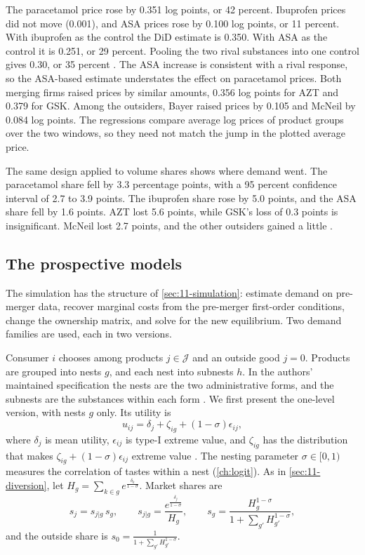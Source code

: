 The paracetamol price rose by 0.351 log points, or 42 percent. Ibuprofen prices did not move (0.001), and ASA prices
rose by 0.100 log points, or 11 percent. With ibuprofen as the control the DiD estimate is 0.350. With ASA as the
control it is 0.251, or 29 percent. Pooling the two rival substances into one control gives 0.30, or 35 percent
\citep[fn.~17]{BjornerstedtVerboven2013}. The ASA increase is consistent with a rival response, so the ASA-based
estimate understates the effect on paracetamol prices. Both merging firms raised prices by similar amounts, 0.356 log
points for AZT and 0.379 for GSK. Among the outsiders, Bayer raised prices by 0.105 and McNeil by 0.084 log points.
The regressions compare average log prices of product groups over the two windows, so they need not match the jump
in the plotted average price.

The same design applied to volume shares shows where demand went. The paracetamol share fell by 3.3 percentage
points, with a 95 percent confidence interval of 2.7 to 3.9 points. The ibuprofen share rose by 5.0 points, and the
ASA share fell by 1.6 points. AZT lost 5.6 points, while GSK's loss of 0.3 points is insignificant. McNeil lost 2.7
points, and the other outsiders gained a little \citep[pp.~31--32]{BjornerstedtVerboven2013}.

\subsection{The prospective models}\label{sec:11-bv-model}

The simulation has the structure of \cref{sec:11-simulation}: estimate demand on pre-merger data, recover marginal
costs from the pre-merger first-order conditions, change the ownership matrix, and solve for the new equilibrium.
Two demand families are used, each in two versions.

 Consumer $i$ chooses among products $j\in\mathcal{J}$ and an outside good $j=0$. Products are
grouped into nests $g$, and each nest into subnests $h$. In the authors' maintained specification the nests are the
two administrative forms, and the subnests are the substances within each form
\citep[p.~20]{BjornerstedtVerboven2013}. We first present the one-level version, with nests $g$ only. Its utility is
\begin{equation*}
u_{ij}=\delta_j+\zeta_{ig}+(1-\sigma)\epsilon_{ij},
\end{equation*}
where $\delta_j$ is mean utility, $\epsilon_{ij}$ is type-I extreme value, and $\zeta_{ig}$ has the distribution
that makes $\zeta_{ig}+(1-\sigma)\epsilon_{ij}$ extreme value \citep{Cardell1997}. The nesting parameter
$\sigma\in[0,1)$ measures the correlation of tastes within a nest (\cref{ch:logit}). As in \cref{sec:11-diversion},
let $H_g=\sum_{k\in g}e^{\frac{\delta_k}{1-\sigma}}$. Market shares are
\begin{equation}\label{eq:11-nl-shares}
s_j=s_{j|g}\,s_g,\qquad s_{j|g}=\frac{e^{\frac{\delta_j}{1-\sigma}}}{H_g},\qquad s_g=\frac{H_g^{1-\sigma}}{1+\sum_{g'}H_{g'}^{1-\sigma}},
\end{equation}
and the outside share is $s_0=\frac{1}{1+\sum_{g'}H_{g'}^{1-\sigma}}$.

